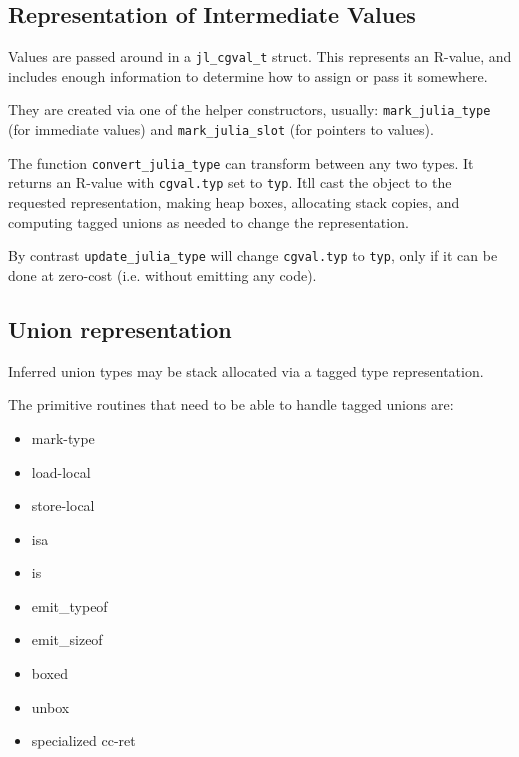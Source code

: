 \hypertarget{9352283582715079729}{}


\subsection{Representation of Intermediate Values}



Values are passed around in a \texttt{jl\_cgval\_t} struct. This represents an R-value, and includes enough information to determine how to assign or pass it somewhere.



They are created via one of the helper constructors, usually: \texttt{mark\_julia\_type} (for immediate values) and \texttt{mark\_julia\_slot} (for pointers to values).



The function \texttt{convert\_julia\_type} can transform between any two types. It returns an R-value with \texttt{cgval.typ} set to \texttt{typ}. It{\textquotesingle}ll cast the object to the requested representation, making heap boxes, allocating stack copies, and computing tagged unions as needed to change the representation.



By contrast \texttt{update\_julia\_type} will change \texttt{cgval.typ} to \texttt{typ}, only if it can be done at zero-cost (i.e. without emitting any code).



\hypertarget{3738811278233217209}{}


\subsection{Union representation}



Inferred union types may be stack allocated via a tagged type representation.



The primitive routines that need to be able to handle tagged unions are:



\begin{itemize}
\item mark-type


\item load-local


\item store-local


\item isa


\item is


\item emit\_typeof


\item emit\_sizeof


\item boxed


\item unbox


\item specialized cc-ret

\end{itemize}


